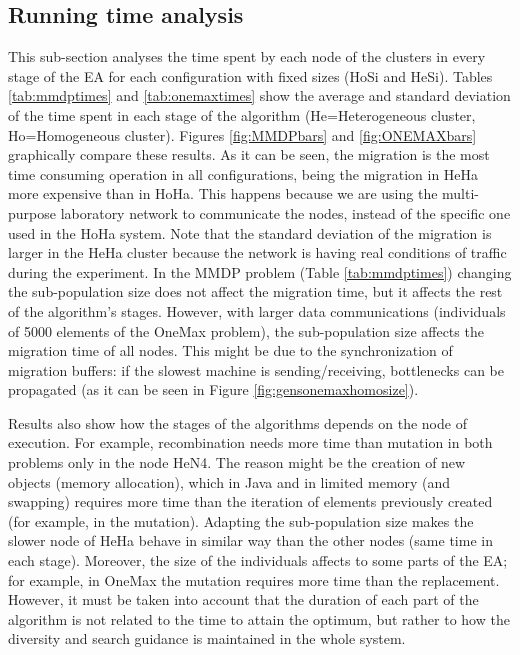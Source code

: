 
\subsection{Running time analysis}

This sub-section analyses the time spent by each node of the clusters
in every %
 stage of the EA for each configuration with fixed sizes (HoSi and HeSi). Tables \ref{tab:mmdptimes} and \ref{tab:onemaxtimes} show the average and standard deviation of the time spent in each stage of the algorithm (He=Heterogeneous cluster, Ho=Homogeneous cluster). Figures \ref{fig:MMDPbars} and \ref{fig:ONEMAXbars} graphically compare these results. As it can be seen, the migration is the most time consuming operation in all configurations, being the migration in HeHa more expensive than in HoHa. This happens because we are using the multi-purpose laboratory network to communicate the nodes, instead of the specific one used in the HoHa system. Note that the standard deviation of the migration is larger in the HeHa cluster because the network is having real conditions of traffic during the experiment. In the MMDP problem (Table \ref{tab:mmdptimes}) changing the sub-population size does not affect the migration time, but it affects the rest of the algorithm's stages. However, with larger data communications (individuals of 5000 elements of the OneMax problem), the sub-population size affects the migration time of all nodes. This might be due to the synchronization of migration buffers: if the slowest machine is sending/receiving, bottlenecks can be propagated (as it can be seen in Figure \ref{fig:gensonemaxhomosize}). 

Results also show how the stages of the algorithms depends on the node
of execution. For example, recombination needs more time than mutation
in both problems only in the node HeN4. The reason might be the
creation of new objects (memory allocation), which in Java and in
limited memory (and swapping) requires more time than the iteration of
elements previously created (for example, in the mutation). Adapting
the sub-population size makes the slower node of HeHa behave in similar
way than the other nodes (same time in each stage). Moreover, the size
of the individuals affects to some parts of the EA; for example, in 
OneMax the mutation requires more time than the replacement. However,
it must be taken into account that the duration of each part of the
algorithm is not related to the time to attain the optimum, but rather to
how the diversity and search guidance is maintained in the whole system.  

